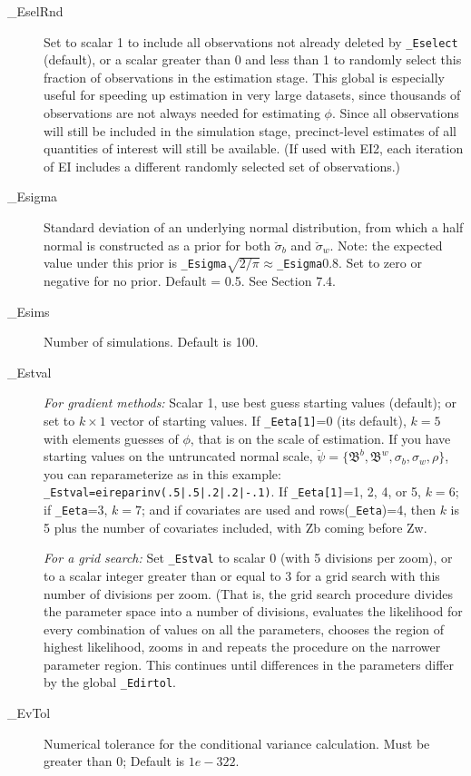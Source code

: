 \documentclass[11pt,titlepage]{article}
\newcommand{\bbeta}{{\mathfrak B}}
\newcommand{\sigmau}{\breve{\sigma}}
\newcommand{\psiu}{\breve{\psi}}
\begin{document}
\begin{description}
\item[\_EselRnd] Set to scalar 1 to include all observations not
  already deleted by \texttt{\_Eselect} (default), or a scalar greater
  than 0 and less than 1 to randomly select this fraction of
  observations in the estimation stage.  This global is especially
  useful for speeding up estimation in very large datasets, since
  thousands of observations are not always needed for estimating
  $\phi$.  Since all observations will still be included in the
  simulation stage, precinct-level estimates of all quantities of
  interest will still be available.  (If used with EI2, each iteration
  of EI includes a different randomly selected set of observations.)

\item[\_Esigma] Standard deviation of an underlying normal
  distribution, from which a half normal is constructed as a prior for
  both $\sigmau_b$ and $\sigmau_w$.  Note: the expected value under
  this prior is \texttt{\_Esigma}$\sqrt{2/\pi}
  \approx$\texttt{\_Esigma}0.8.  Set to zero or negative for no prior.
  Default = 0.5.  See Section 7.4.

\item[\_Esims] Number of simulations. Default is 100.

\item[\_Estval] \emph{For gradient methods:} Scalar 1, use best guess
  starting values (default); or set to $k\times 1$ vector of starting
  values.  If \texttt{\_Eeta[1]}=0 (its default), $k=5$ with elements
  guesses of $\phi$, that is on the scale of estimation.  If you have
  starting values on the untruncated normal scale,
  $\psiu=\{\bbeta^b,\bbeta^w,\sigma_b,\sigma_w,\rho\}$, you can
  reparameterize as in this example:
  \texttt{\_Estval=eireparinv(.5|.5|.2|.2|-.1)}.  If
  \texttt{\_Eeta[1]}=1, 2, 4, or 5, $k=6$; if \texttt{\_Eeta}=3,
  $k=7$; and if covariates are used and rows(\texttt{\_Eeta})=4, then
  $k$ is 5 plus the number of covariates included, with Zb coming
  before Zw.

  \emph{For a grid search:} Set \texttt{\_Estval} to scalar 0 (with 5
  divisions per zoom), or to a scalar integer greater than or equal to
  3 for a grid search with this number of divisions per zoom.  (That
  is, the grid search procedure divides the parameter space into a
  number of divisions, evaluates the likelihood for every combination
  of values on all the parameters, chooses the region of highest
  likelihood, zooms in and repeats the procedure on the narrower
  parameter region.  This continues until differences in the
  parameters differ by the global \texttt{\_Edirtol}.

\item[\_EvTol] Numerical tolerance for the conditional variance
  calculation.  Must be greater than 0; Default is $1e-322$.
\end{description}
\end{document}
